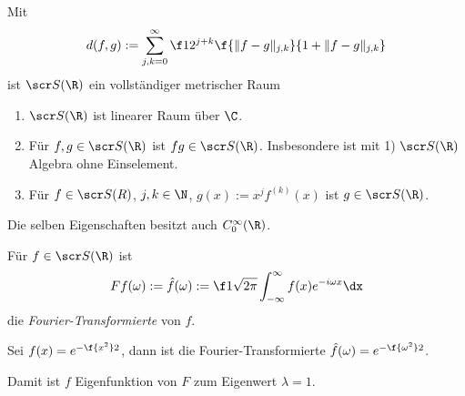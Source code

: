 \begin{nt} \label{4.3}
	Mit
	\[
		d(f,g) := \sum_{j,k = 0}^\infty \f 1{2^{j+k}} \f {\|f-g\|_{j,k}}{1+ \|f-g\|_{j,k}}
	\]
	ist $\scr S(\R)$ ein vollständiger metrischer Raum
\end{nt}

\begin{nt}[Eigenschaften] \label{4.4}
	\begin{enumerate}[1)]
		\item
			$\scr S(\R)$ ist linearer Raum über $\C$.
		\item
			Für $f,g \in \scr S (\R)$ ist $fg \in \scr S(\R)$.
			Insbesondere ist mit 1) $\scr S(\R)$ Algebra ohne Einselement.
		\item
			Für $f \in \scr S(R)$, $j,k \in \N$, $g(x) := x^j f^{(k)}(x)$ ist $g \in \scr S(\R)$.
	\end{enumerate}
	Die selben Eigenschaften besitzt auch $C_0^\infty(\R)$.
\end{nt}

\begin{df} \label{4.5}
	Für $f \in \scr S (\R)$ ist
	\[
		Ff(\omega) := \hat f(\omega) := \f 1{\sqrt{2\pi}} \int_{-\infty}^\infty f(x) e^{-i\omega x} \dx
	\]
	die \emph{Fourier-Transformierte} von $f$.
\end{df}

\begin{ex} \label{4.6}
	Sei $f(x) = e^{-\f {x^2}2}$, dann ist die Fourier-Transformierte $\hat f(\omega) = e^{-\f {\omega^2}2}$.

	Damit ist $f$ Eigenfunktion von $F$ zum Eigenwert $\lambda = 1$.
\end{ex}

